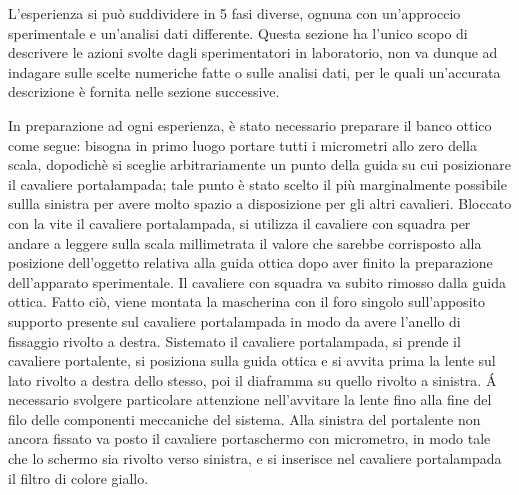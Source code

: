 L'esperienza si può suddividere in 5 fasi diverse, ognuna con un'approccio sperimentale e un'analisi dati differente. Questa sezione
 ha l'unico scopo di descrivere le azioni svolte dagli sperimentatori in laboratorio, non va dunque ad indagare sulle scelte
 numeriche fatte o sulle analisi dati, per le quali un'accurata descrizione è fornita nelle sezione successive.


 In preparazione ad ogni esperienza, è stato necessario preparare il banco ottico come segue:
 bisogna in primo luogo portare tutti i micrometri allo zero della scala, dopodichè si sceglie arbitrariamente
 un punto della guida su cui posizionare il cavaliere portalampada; tale punto è stato scelto il più marginalmente possibile sullla
 sinistra per avere
 molto spazio a disposizione per gli altri cavalieri. Bloccato con la vite il cavaliere portalampada, si utilizza il cavaliere
 con squadra per andare a leggere sulla scala millimetrata il valore che sarebbe corrisposto alla posizione dell'oggetto
 relativa alla guida ottica dopo aver finito la preparazione dell'apparato sperimentale. Il cavaliere con squadra va subito
 rimosso dalla guida ottica. Fatto ciò, viene montata la mascherina con il foro singolo sull'apposito supporto presente sul
 cavaliere portalampada in modo da avere l'anello di fissaggio rivolto a destra.
 Sistemato il cavaliere portalampada, si prende il cavaliere portalente, si posiziona
 sulla guida ottica e si avvita prima la lente sul lato rivolto a destra dello stesso, poi il diaframma
 su quello rivolto a sinistra. \'A necessario svolgere particolare attenzione nell'avvitare la lente fino alla fine del filo
 delle componenti meccaniche del sistema. Alla sinistra del portalente non ancora fissato va posto il cavaliere portaschermo
 con micrometro, in modo tale che lo schermo sia rivolto verso sinistra, e si inserisce nel cavaliere portalampada il filtro
 di colore giallo.

